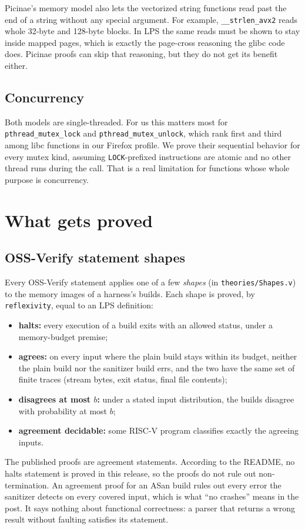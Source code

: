 \documentclass[11pt]{article}
\newcommand{\code}[1]{\texttt{#1}}
\begin{document}
Picinae's memory model also lets the vectorized string functions read past
the end of a string without any special argument.  For example,
\code{\_\_strlen\_avx2} reads whole 32-byte and 128-byte blocks.  In LPS the
same reads must be shown to stay inside mapped pages, which is exactly the
page-cross reasoning the glibc code does.  Picinae proofs can skip that
reasoning, but they do not get its benefit either.

\subsection{Concurrency}

Both models are single-threaded.  For us this matters most for
\code{pthread\_mutex\_lock} and \code{pthread\_mutex\_unlock}, which rank
first and third among libc functions in our Firefox profile.  We prove their
sequential behavior for every mutex kind, assuming \code{LOCK}-prefixed
instructions are atomic and no other thread runs during the call.  That is
a real limitation for functions whose whole purpose is concurrency.

\section{What gets proved}\label{sec:what}

\subsection{OSS-Verify statement shapes}

Every OSS-Verify statement applies one of a few \emph{shapes} (in
\code{theories/Shapes.v}) to the memory images of a harness's builds.  Each
shape is proved, by \code{reflexivity}, equal to an LPS definition:
\begin{itemize}[nosep]
\item \textbf{halts:} every execution of a build exits with an allowed
      status, under a memory-budget premise;
\item \textbf{agrees:} on every input where the plain build stays within its
      budget, neither the plain build nor the sanitizer build errs, and the
      two have the same set of finite traces (stream bytes, exit status,
      final file contents);
\item \textbf{disagrees at most $b$:} under a stated input distribution, the
      builds disagree with probability at most $b$;
\item \textbf{agreement decidable:} some RISC-V program classifies exactly
      the agreeing inputs.
\end{itemize}
The published proofs are agreement statements.  According to the README, no
halts statement is proved in this release, so the proofs do not rule out
non-termination.  An agreement proof for an ASan build rules out every error
the sanitizer detects on every covered input, which is what ``no crashes''
means in the post.  It says nothing about functional correctness: a parser
that returns a wrong result without faulting satisfies its statement.
\end{document}
